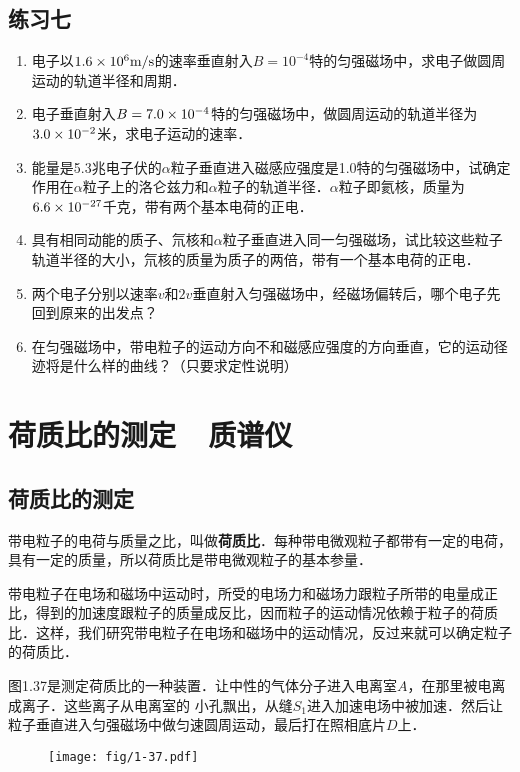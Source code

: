 \subsection*{练习七}
\begin{enumerate}
    \item 电子以$1.6\times10^6\text{m}/\text{s}$的速率垂直射入$B=10^{-4}$特的匀强磁场中，求电子做圆周运动的轨道半径和周期．
    \item 电子垂直射入$B=7.0\times10^{-4}$特的匀强磁场中，做圆周运动的轨道半径为$3.0\times10^{-2}$米，求电子运动的速率．
    \item 能量是5.3兆电子伏的$\alpha$粒子垂直进入磁感应强度是1.0特的匀强磁场中，试确定作用在$\alpha$粒子上的洛仑兹力和$\alpha$粒子的轨道半径．$\alpha$粒子即氦核，质量为$6.6\times10^{-27}$千克，带有两个基本电荷的正电．
    \item 具有相同动能的质子、氘核和$\alpha$粒子垂直进入同一匀强磁场，试比较这些粒子轨道半径的大小，氘核的质量为质子的两倍，带有一个基本电荷的正电．
    \item 两个电子分别以速率$v$和$2v$垂直射入匀强磁场中，经磁场偏转后，哪个电子先回到原来的出发点？
    \item 在匀强磁场中，带电粒子的运动方向不和磁感应强度的方向垂直，它的运动径迹将是什么样的曲线？（只要求定性说明）
\end{enumerate}


\section{荷质比的测定~~质谱仪}
\subsection{荷质比的测定}

带电粒子的电荷与质量之比，叫做\textbf{荷质比}．每种带电微观粒子都带有一定的电荷，具有一定的质量，所以荷质比是带电微观粒子的基本参量．

带电粒子在电场和磁场中运动时，所受的电场力和磁场力跟粒子所带的电量成正比，得到的加速度跟粒子的质量成反比，因而粒子的运动情况依赖于粒子的荷质比．这样，我们研究带电粒子在电场和磁场中的运动情况，反过来就可以确定粒子的荷质比．

图1.37是测定荷质比的一种装置．让中性的气体分子进入电离室$A$，在那里被电离成离子．这些离子从电离室的
小孔飘出，从缝$S_1$进入加速电场中被加速．然后让粒子垂直进入匀强磁场中做匀速圆周运动，最后打在照相底片$D$上．
\begin{figure}[htp]\centering
\texttt{[image: fig/1-37.pdf]}
\caption{}
\end{figure}

